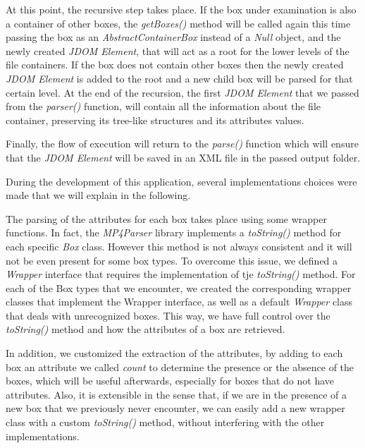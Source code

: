 At this point, the recursive step takes place. If the box under examination is also a container of other boxes, the \emph{getBoxes()} method will be called again this time passing the box as an \emph{AbstractContainerBox} instead of a \emph{Null} object, and the newly created \emph{JDOM Element}, that will act as a root for the lower levels of the file containers. If the box does not contain other boxes then the newly created \emph{JDOM Element} is added to the root and a new child box will be parsed for that certain level.
At the end of the recursion, the first \emph{JDOM Element} that we passed from the \emph{parser()} function, will contain all the information about the file container, preserving its tree-like structures and its attributes values.

Finally, the flow of execution will return to the \emph{parse()} function which will ensure that the \emph{JDOM Element} will be saved in an XML file in the passed output folder.

During the development of this application, several implementations choices were made that we will explain in the following.

The parsing of the attributes for each box takes place using some wrapper functions. In fact, the \emph{MP4Parser} library implements a \emph{toString()} method for each specific \emph{Box} class. However this method is not always consistent and it will not be even present for some box types. To overcome this issue, we defined a \emph{Wrapper} interface that requires the implementation of tje \emph{toString()} method. For each of the Box types that we encounter, we created the corresponding wrapper classes that implement the Wrapper interface, as well as a default \emph{Wrapper} class that deals with unrecognized boxes. This way, we have full control over the \emph{toString()} method and how the attributes of a box are retrieved. 

In addition, we customized the extraction of the attributes, by adding to each box an attribute we called \emph{count} to determine the presence or the absence of the boxes, which will be useful afterwards, especially for boxes that do not have attributes.
Also, it is extensible in the sense that, if we are in the presence of a new box that we previously never encounter, we can easily add a new wrapper class with a custom \emph{toString()} method, without interfering with the other implementations.

